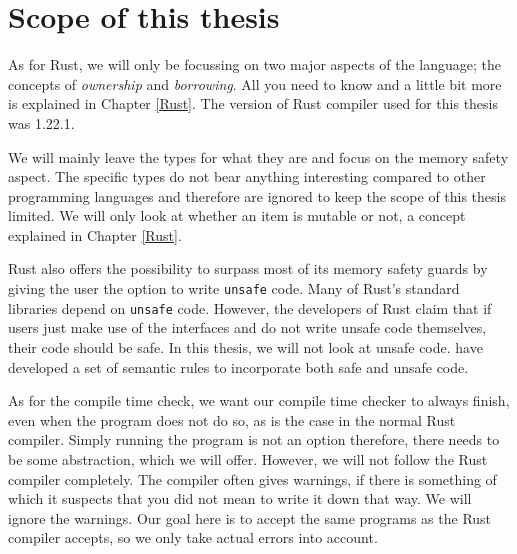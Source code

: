 



\section{Scope of this thesis}
As for Rust, we will only be focussing on two major aspects of the language; the concepts of \emph{ownership} and \emph{borrowing}. All you need to know and a little bit more is explained in Chapter \ref{Rust}. The version of Rust compiler used for this thesis was 1.22.1. 

We will mainly leave the types for what they are and focus on the memory safety aspect. The specific types do not bear anything interesting compared to other programming languages and therefore are ignored to keep the scope of this thesis limited. We will only look at whether an item is mutable or not, a concept explained in Chapter \ref{Rust}. 

Rust also offers the possibility to surpass most of its memory safety guards by giving the user the option to write \texttt{unsafe} code. Many of Rust's standard libraries depend on \texttt{unsafe} code. However, the developers of Rust claim that if users just make use of the interfaces and do not write unsafe code themselves, their code should be safe. In this thesis, we will not look at unsafe code. \cite{jung2017rustbelt} have developed a set of semantic rules to incorporate both safe and unsafe code. 

As for the compile time check, we want our compile time checker to always finish, even when the program does not do so, as is the case in the normal Rust compiler. Simply running the program is not an option therefore, there needs to be some abstraction, which we will offer. However, we will not follow the Rust compiler completely. The compiler often gives warnings, if there is something of which it suspects that you did not mean to write it down that way. We will ignore the warnings. Our goal here is to accept the same programs as the Rust compiler accepts, so we only take actual errors into account. 

